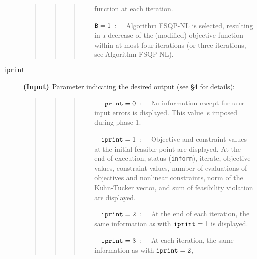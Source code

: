 \begin{description}
\begin{quote}
\begin{quote}
\begin{quote}
\begin{itemize}
                                           function at each iteration.
                  \item[${\tt B} = 1$~:~~]Algorithm FSQP-NL is 
                                           selected, resulting in a 
                                           decrease of the (modified) objective
                                           function within at 
                                           most four iterations (or three
                                           iterations, see Algorithm FSQP-NL).
                  \end{itemize}
                  \end{quote}
                  \end{quote}
                  \end{quote}
\item[\tt iprint] {\bf (Input)}~Parameter indicating the 
                  desired output (see \S 4 for details):
                  \begin{quote}
                  \begin{quote}
                  \begin{quote}
                  \begin{itemize}
                  \item[~~${\tt iprint} =0$~:~~] No information except 
                                for user-input errors is displayed. This value
                                is imposed during phase 1.
                  \item[~~${\tt iprint} =1$~:~~] 
                                Objective and constraint values 
                                at the initial feasible point are displayed.
                                At the end of execution, status ({\tt inform}),
                                iterate, objective values, constraint values,
                                number of evaluations of objectives and 
                                nonlinear constraints, norm of the Kuhn-Tucker 
                                vector, and sum of feasibility violation
                                are displayed.
                  \item[~~${\tt iprint} =2$~:~~] At the end of each 
                                iteration, the same information as with
                                ${\tt iprint}=1$ is displayed.
                  \item[~~${\tt iprint} =3$~:~~] At each iteration, 
                                the same information as with ${\tt iprint}=2$, 

\end{itemize}
\end{quote}
\end{quote}
\end{quote}
\end{description}
